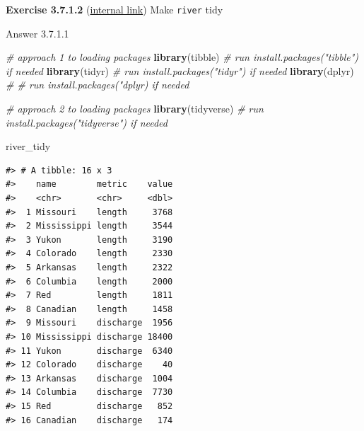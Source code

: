 \documentclass[
]{book}
\newenvironment{Shaded}{\begin{snugshade}}{\end{snugshade}}
\newcommand{\CommentTok}[1]{\textcolor[rgb]{0.56,0.35,0.01}{\textit{#1}}}
\newcommand{\DataTypeTok}[1]{\textcolor[rgb]{0.13,0.29,0.53}{#1}}
\newcommand{\KeywordTok}[1]{\textcolor[rgb]{0.13,0.29,0.53}{\textbf{#1}}}
\newcommand{\NormalTok}[1]{#1}
\newcommand{\OperatorTok}[1]{\textcolor[rgb]{0.81,0.36,0.00}{\textbf{#1}}}
\newcommand{\StringTok}[1]{\textcolor[rgb]{0.31,0.60,0.02}{#1}}
\begin{document}
\textbf{Exercise 3.7.1.2} (\protect\hyperlink{ex-set14}{internal link})
Make \texttt{river} tidy

Answer 3.7.1.1

\begin{Shaded}
\begin{Highlighting}[]
\CommentTok{# approach 1 to loading packages}
\KeywordTok{library}\NormalTok{(tibble) }\CommentTok{# run install.packages("tibble") if needed}
\KeywordTok{library}\NormalTok{(tidyr) }\CommentTok{# run install.packages("tidyr") if needed}
\KeywordTok{library}\NormalTok{(dplyr) }\CommentTok{# # run install.packages("dplyr) if needed}
\end{Highlighting}
\end{Shaded}

\begin{Shaded}
\begin{Highlighting}[]
\CommentTok{# approach 2 to loading packages}
\KeywordTok{library}\NormalTok{(tidyverse) }\CommentTok{# run install.packages("tidyverse") if needed}
\end{Highlighting}
\end{Shaded}

\begin{Shaded}
\end{Shaded}

\begin{Shaded}
\begin{Highlighting}[]
\NormalTok{river_tidy}
\end{Highlighting}
\end{Shaded}

\begin{verbatim}
#> # A tibble: 16 x 3
#>    name        metric    value
#>    <chr>       <chr>     <dbl>
#>  1 Missouri    length     3768
#>  2 Mississippi length     3544
#>  3 Yukon       length     3190
#>  4 Colorado    length     2330
#>  5 Arkansas    length     2322
#>  6 Columbia    length     2000
#>  7 Red         length     1811
#>  8 Canadian    length     1458
#>  9 Missouri    discharge  1956
#> 10 Mississippi discharge 18400
#> 11 Yukon       discharge  6340
#> 12 Colorado    discharge    40
#> 13 Arkansas    discharge  1004
#> 14 Columbia    discharge  7730
#> 15 Red         discharge   852
#> 16 Canadian    discharge   174
\end{verbatim}
\end{document}
